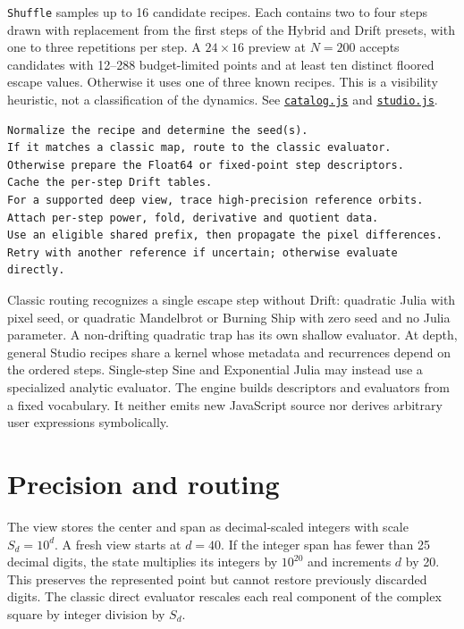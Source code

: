 \documentclass[11pt,a4paper]{article}
\numberwithin{equation}{section}
\newcommand{\code}[1]{\texttt{#1}}
\begin{document}
\texttt{Shuffle} samples up to 16 candidate recipes. Each contains two
to four steps drawn with replacement from the first steps of the Hybrid
and Drift presets, with one to three repetitions per step. A
\(24\times16\) preview at \(N=200\) accepts candidates with 12--288
budget-limited points and at least ten distinct floored escape values.
Otherwise it uses one of three known recipes. This is a visibility
heuristic, not a classification of the dynamics. See
\href{../dist/catalog.js}{\code{catalog.js}} and
\href{../dist/studio.js}{\code{studio.js}}.

\begin{Verbatim}[fontsize=\small]
Normalize the recipe and determine the seed(s).
If it matches a classic map, route to the classic evaluator.
Otherwise prepare the Float64 or fixed-point step descriptors.
Cache the per-step Drift tables.
For a supported deep view, trace high-precision reference orbits.
Attach per-step power, fold, derivative and quotient data.
Use an eligible shared prefix, then propagate the pixel differences.
Retry with another reference if uncertain; otherwise evaluate directly.
\end{Verbatim}

Classic routing recognizes a single escape step without Drift:
quadratic Julia with pixel seed, or quadratic Mandelbrot or Burning Ship
with zero seed and no Julia parameter. A non-drifting quadratic trap has
its own shallow evaluator. At depth, general Studio recipes share a
kernel whose metadata and recurrences depend on the ordered steps.
Single-step Sine and Exponential Julia may instead use a specialized
analytic evaluator. The engine builds descriptors and evaluators from a
fixed vocabulary. It neither emits new JavaScript source nor derives
arbitrary user expressions symbolically.

\section{Precision and routing}\label{sec:precision}

The view stores the center and span as decimal-scaled integers with
scale \(S_d=10^d\). A fresh view starts at \(d=40\). If the integer
span has fewer than 25 decimal digits, the state multiplies its
integers by \(10^{20}\) and increments \(d\) by 20. This preserves the
represented point but cannot restore previously discarded digits. The
classic direct evaluator rescales each real component of the complex
square by integer division by \(S_d\).
\end{document}
